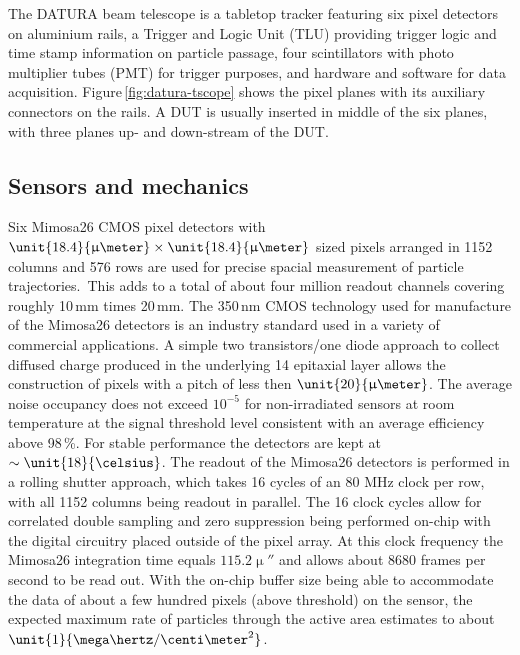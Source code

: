 
The DATURA beam telescope is a tabletop tracker featuring six pixel detectors on aluminium rails, a Trigger and Logic Unit (TLU) providing trigger logic and time stamp information on particle passage,
 four scintillators with photo multiplier tubes (PMT) for trigger purposes, and hardware and software for data acquisition. 
Figure\,\ref{fig:datura-tscope} shows the pixel planes with its auxiliary connectors on the rails. 
A DUT is usually inserted in middle of the six planes, with three planes up- and down-stream of the DUT. 
 
\subsection{Sensors and mechanics}

Six Mimosa26 CMOS pixel detectors with $\unit{18.4}{\upmu\meter} \times \unit{18.4}{\upmu\meter}$ sized pixels arranged in 1152 columns and 576 rows
 are used for precise spacial measurement of particle trajectories.\,\cite{Mimosa26}
This adds to a total of about four million readout channels covering roughly 10\,mm times 20\,mm. 
The 350\,nm CMOS technology used for manufacture of the Mimosa26 detectors is an industry standard used in a variety of commercial applications. 
A simple two transistors/one diode approach to collect diffused charge produced in the underlying \unit{14}{\upmu\meter} epitaxial layer
 allows the construction of pixels with a pitch of less then $\unit{20}{\upmu\meter}$.
The average noise occupancy does not exceed $10^{-5}$ for non-irradiated sensors at room temperature at the signal threshold level consistent with an average efficiency above 98\,\%. 
For stable performance the detectors are kept at $\sim\unit{18}{\celsius}$. 
The readout of the Mimosa26 detectors is performed in a rolling shutter approach, which takes 16 cycles of an 80 MHz clock per row, with all 1152 columns being readout in parallel. 
The 16 clock cycles allow for correlated double sampling and zero suppression being performed on-chip with the digital circuitry placed outside of the pixel array.
At this clock frequency the Mimosa26 integration time equals $\unit{115.2}{\upmu\second}$ and allows about 8680 frames per second to be read out. 
With the on-chip buffer size being able to accommodate the data of about a few hundred pixels (above threshold) on the sensor,
the expected maximum rate of particles through the active area estimates to about $\unit{1}{\mega\hertz/\centi\meter^2}$. 

